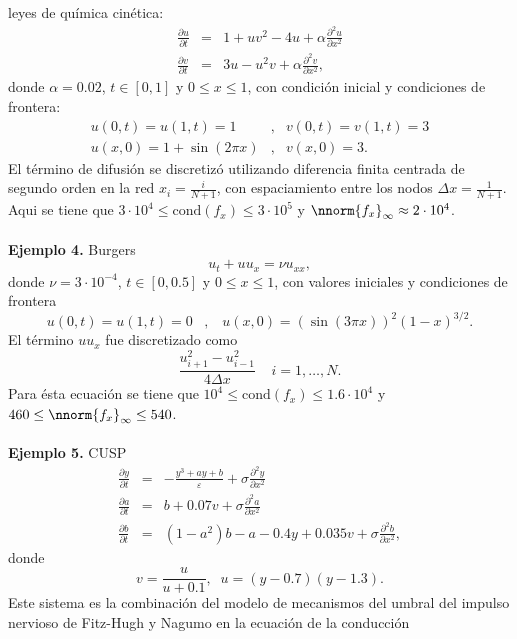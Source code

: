 leyes de qu\'imica cin\'etica:
\begin{eqnarray*}
	\frac{\partial u}{\partial t}&=&1+uv^{2}-4u+\alpha \frac{\partial ^{2}u}{\partial x^{2}}\\
	\frac{\partial v}{\partial t}&=&3u-u^{2}v+\alpha \frac{\partial ^{2}v}{\partial x^{2}},
\end{eqnarray*}
donde $\alpha = 0\mathord{.}02$, $t\in [0,1]$ y $0\leq x \leq 1$, con condici\'on inicial y condiciones de frontera:
\begin{eqnarray*}
	u(0,t)=u(1,t)=1 &,& v(0,t)=v(1,t)=3\\
	u(x,0)=1+\sin(2\pi x) &,& v(x,0)=3.
\end{eqnarray*}
El t\'ermino de difusi\'on se discretiz\'o utilizando diferencia finita centrada de segundo orden
en la red $x_i=\frac{i}{N+1}$, con espaciamiento entre los nodos $\Delta x = \frac{1}{N+1}$. Aqui se tiene que $3\cdot 10^4\leq \mathrm{cond}(f_x)\leq 3\cdot 10^5$ y $\nnorm{f_x}_\infty\approx 2\cdot 10^4$.\\ \\
\textbf{Ejemplo 4.} Burgers~\cite{tokman}
\[ u_t+uu_x=\nu u_{xx}, \]
donde $\nu = 3\cdot10^{-4}$, $t\in [0,0\mathord{.}5]$ y $0\leq x\leq 1$, 
con valores iniciales y condiciones de frontera
\begin{equation*}
   u(0,t)=u(1,t)=0 \;\;\; ,   \;\;\;  u(x,0)=(\sin(3\pi x))^{2}(1-x)^{3/2}.
\end{equation*}
El t\'ermino  $uu_x$ fue discretizado como
\[ \frac{u_{i+1}^{2}-u_{i-1}^{2}}{4\Delta x} \;\;\;\;  i=1,\ldots,N.\] Para ésta ecuación se tiene que  
$10^4\leq \mathrm{cond}(f_x)\leq 1\mathord{.}6\cdot 10^4$ y $460\leq\nnorm{f_x}_\infty\leq 540$. \\ \\
\textbf{Ejemplo 5.} CUSP~\cite{tokman} 
\begin{eqnarray*}
	\frac{\partial y}{\partial t} &=& -\frac{y^{3}+ay+b}{\varepsilon}+\sigma\frac{\partial^{2}y}{\partial x^{2}}\\
	\frac{\partial a}{\partial t} &=& b+0\mathord{.}07v+\sigma \frac{\partial^{2}a}{\partial x^{2}}\\
	\frac{\partial b}{\partial t} &=& (1-a^{2})b-a-0\mathord{.}4y+0\mathord{.}035v+\sigma\frac{\partial^{2}b}{\partial x^{2}},
\end{eqnarray*}
donde 
\[ v= \frac{u}{u+0\mathord{.}1},\;\; u=(y-0\mathord{.}7)(y-1\mathord{.}3).\]
Este sistema es la combinación del modelo de mecanismos del umbral del impulso nervioso de Fitz-Hugh y Nagumo en la ecuación de la conducción
